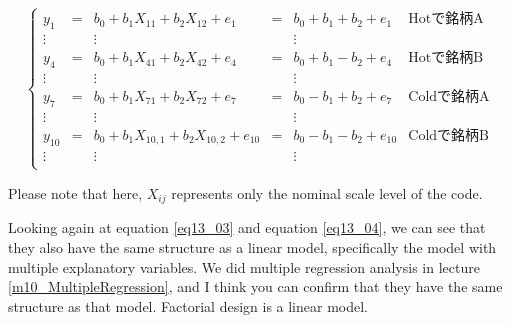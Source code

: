 \documentclass{ltjbook}
\begin{document}
\[
	\label{eq13_04}
	\left \{
	\begin{array}{cccccc}
		y_1    & = & b_0 + b_1 X_{11} + b_2 X_{12} + e_1        & = & b_0 + b_1 + b_2 + e_1    & \mbox{Hotで銘柄A}  \\
		\vdots &   & \vdots                                     &   & \vdots                   &                 \\
		y_4    & = & b_0 + b_1 X_{41} + b_2 X_{42} + e_4        & = & b_0 + b_1 - b_2 + e_4    & \mbox{Hotで銘柄B}  \\
		\vdots &   & \vdots                                     &   & \vdots                   &                 \\
		y_7    & = & b_0 + b_1 X_{71} + b_2 X_{72} + e_7        & = & b_0 - b_1 + b_2 + e_7    & \mbox{Coldで銘柄A} \\
		\vdots &   & \vdots                                     &   & \vdots                   &                 \\
		y_{10} & = & b_0 + b_1 X_{10,1} + b_2 X_{10,2} + e_{10} & = & b_0 - b_1 - b_2 + e_{10} & \mbox{Coldで銘柄B} \\
		\vdots &   & \vdots                                     &   & \vdots                   &                 \\
	\end{array}
	\right.
\]

Please note that here, $X_{ij}$ represents only the nominal scale level of the code.

Looking again at equation \ref{eq13_03} and equation \ref{eq13_04}, we can see that they also have the same structure as a linear model, specifically the  model with multiple explanatory variables. We did multiple regression analysis in lecture \ref{m10_MultipleRegression}, and I think you can confirm that they have the same structure as that model. Factorial design is a linear model.


\end{document}
